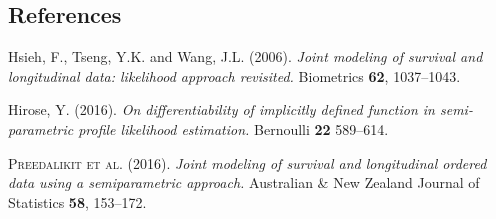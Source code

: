 \documentclass[12pt]{article}
\begin{document}
%        
%
%        

\subsection*{References}

\begin{description}

\item Hsieh, F.,  Tseng, Y.K. and Wang, J.L. (2006). 
\textit{Joint modeling of survival and longitudinal data: likelihood approach revisited.}
Biometrics {\bf 62}, 1037--1043. 

\item Hirose, Y. (2016).  
\textit{On differentiability of implicitly defined
function in semi-parametric profile
likelihood estimation.}
Bernoulli \textbf{22} 589--614.


\item \textsc{Preedalikit et al.} (2016). 
\textit{Joint modeling of survival and longitudinal ordered data using a semiparametric approach.}
Australian \& New Zealand Journal of Statistics  {\bf 58}, 153--172. 



\end{description}
\end{document}
